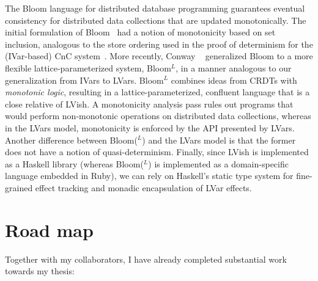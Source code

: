 \documentclass{article}
\begin{document}
The Bloom language for distributed database programming guarantees
eventual consistency for distributed data collections that are updated
monotonically.  The initial formulation of Bloom~\cite{bloom-cidr} had
a notion of monotonicity based on set inclusion, analogous to the
store ordering used in the proof of determinism for the (IVar-based)
CnC system~\cite{CnC}.  More recently, Conway \etal~\cite{blooml}
generalized Bloom to a more flexible lattice-parameterized system,
Bloom$^L$, in a manner analogous to our generalization from IVars to
LVars.  Bloom$^L$ combines ideas from CRDTs with \emph{monotonic
  logic}, resulting in a lattice-parameterized, confluent language
that is a close relative of LVish.  A monotonicity analysis pass rules
out programs that would perform non-monotonic operations on
distributed data collections, whereas in the LVars model, monotonicity
is enforced by the API presented by LVars.  Another difference between
Bloom($^L$) and the LVars model is that the former does not have a
notion of quasi-determinism.  Finally, since LVish is
implemented as a Haskell library (whereas Bloom($^L$) is implemented
as a domain-specific language embedded in Ruby), we can rely on
Haskell's static type system for fine-grained effect tracking and
monadic encapsulation of LVar effects.

\section{Road map}

Together with my collaborators, I have already completed substantial
work towards my thesis:
\end{document}
